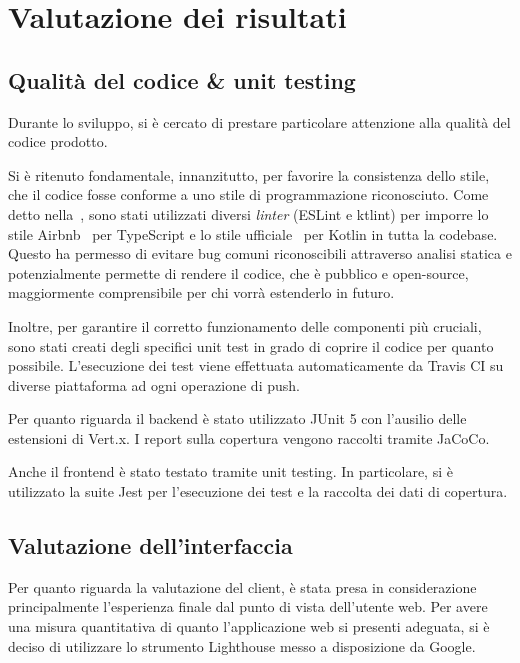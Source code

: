 \chapter{Valutazione dei risultati}\label{ch:evaluation}

  \section{Qualità del codice \& unit testing}
    Durante lo sviluppo, si è cercato di prestare particolare attenzione alla qualità del codice prodotto.

    Si è ritenuto fondamentale, innanzitutto, per favorire la consistenza dello stile, che il codice fosse conforme a uno stile di programmazione riconosciuto.
    Come detto nella~, sono stati utilizzati diversi \emph{linter} (ESLint e ktlint)
    per imporre lo stile Airbnb~\cite{airbnb-javascript} per TypeScript e lo stile ufficiale~\cite{pinterest-ktlint} per Kotlin in tutta la codebase.
    Questo ha permesso di evitare bug comuni riconoscibili attraverso analisi statica
    e potenzialmente permette di rendere il codice, che è pubblico e open-source, maggiormente comprensibile per chi vorrà estenderlo in futuro.

    Inoltre, per garantire il corretto funzionamento delle componenti più cruciali, sono stati creati degli specifici unit test in grado di coprire il codice per quanto possibile.
    L'esecuzione dei test viene effettuata automaticamente da Travis CI su diverse piattaforma ad ogni operazione di push.

    Per quanto riguarda il backend è stato utilizzato JUnit 5 con l'ausilio delle estensioni di Vert.x.
    I report sulla copertura vengono raccolti tramite JaCoCo.


    Anche il frontend è stato testato tramite unit testing.
    In particolare, si è utilizzato la suite Jest per l'esecuzione dei test e la raccolta dei dati di copertura.


  \section{Valutazione dell'interfaccia}
    Per quanto riguarda la valutazione del client, è stata presa in considerazione principalmente l'esperienza finale dal punto di vista dell'utente web.
    Per avere una misura quantitativa di quanto l'applicazione web si presenti adeguata, si è deciso di utilizzare lo strumento Lighthouse messo a disposizione da Google.


